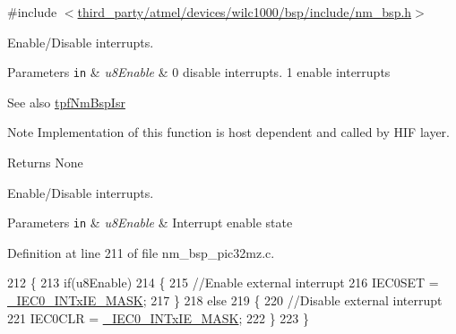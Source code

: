 {\ttfamily \#include $<$\hyperlink{nm__bsp_8h}{third\+\_\+party/atmel/devices/wilc1000/bsp/include/nm\+\_\+bsp.\+h}$>$}



Enable/\+Disable interrupts. 


\begin{DoxyParams}[1]{Parameters}
\mbox{\tt in}  & {\em u8\+Enable} & \textquotesingle{}0\textquotesingle{} disable interrupts. \textquotesingle{}1\textquotesingle{} enable interrupts \\
\hline
\end{DoxyParams}
\begin{DoxySeeAlso}{See also}
\hyperlink{group__BSPDefine_gab061a1639662a3114b4c8b3b39bd6848}{tpf\+Nm\+Bsp\+Isr} 
\end{DoxySeeAlso}
\begin{DoxyNote}{Note}
Implementation of this function is host dependent and called by H\+IF layer. 
\end{DoxyNote}
\begin{DoxyReturn}{Returns}
None
\end{DoxyReturn}
Enable/\+Disable interrupts.


\begin{DoxyParams}[1]{Parameters}
\mbox{\tt in}  & {\em u8\+Enable} & Interrupt enable state \\
\hline
\end{DoxyParams}


Definition at line 211 of file nm\+\_\+bsp\+\_\+pic32mz.\+c.


\begin{DoxyCode}
212 \{
213    \textcolor{keywordflow}{if}(u8Enable)
214    \{
215       \textcolor{comment}{//Enable external interrupt}
216       IEC0SET = \hyperlink{nm__bsp__pic32mz_8c_a12a4929e9d91972bb84c11475533c977}{\_IEC0\_INTxIE\_MASK};
217    \}
218    \textcolor{keywordflow}{else}
219    \{
220       \textcolor{comment}{//Disable external interrupt}
221       IEC0CLR = \hyperlink{nm__bsp__pic32mz_8c_a12a4929e9d91972bb84c11475533c977}{\_IEC0\_INTxIE\_MASK};
222    \}
223 \}
\end{DoxyCode}

